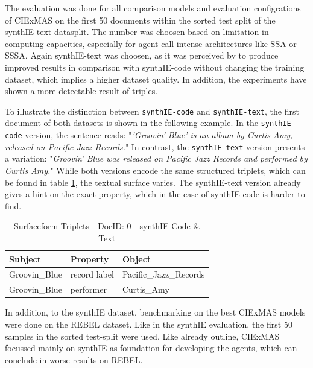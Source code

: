 \documentclass[a4paper,oneside,bibliography=totoc]{scrbook}
\begin{document}
The evaluation was done for all comparison models and evaluation configrations of CIExMAS on the first 50 documents within the sorted test split of the synthIE-text datasplit. The number was choosen based on limitation in computing capacities, especially for agent call intense architectures like \ac{SSA} or \ac{SSSA}. Again synthIE-text was choosen, as it was perceived by \citet{Josifoski2023} to produce improved results in comparison with synthIE-code without changing the training dataset, which implies a higher dataset quality. In addition, the experiments have shown a more detectable result of triples.

To illustrate the distinction between \texttt{synthIE-code} and \texttt{synthIE-text}, the first document of both datasets is shown in the following example. In the \texttt{synthIE-code} version, the sentence reads: "\emph{'Groovin' Blue' is an album by Curtis Amy, released on Pacific Jazz Records.}" In contrast, the \texttt{synthIE-text} version presents a variation: "\emph{Groovin' Blue was released on Pacific Jazz Records and performed by Curtis Amy.}" While both versions encode the same structured triplets, which can be found in table \ref{tab:triple-example}, the textual surface varies. The synthIE-text version already gives a hint on the exact property, which in the case of synthIE-code is harder to find.

\begin{table}[h]
  \centering
  \begin{tabular}{l l l}
    \toprule
    \textbf{Subject} & \textbf{Property} & \textbf{Object}        \\
    \midrule
    Groovin\_Blue    & record label      & Pacific\_Jazz\_Records \\
    Groovin\_Blue    & performer         & Curtis\_Amy            \\
    \bottomrule
  \end{tabular}
  \caption{Surfaceform Triplets - DocID: 0 - synthIE Code \& Text}
  \label{tab:triple-example}
\end{table}

In addition, to the synthIE dataset, benchmarking on the best CIExMAS models were done on the REBEL dataset. Like in the synthIE evaluation, the first 50 samples in the sorted test-split were used. Like already outline, CIExMAS focussed mainly on synthIE as foundation for developing the agents, which can conclude in worse results on REBEL.
\end{document}
